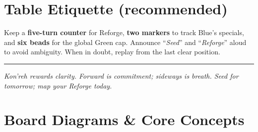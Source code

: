 \documentclass[11pt]{article}
\begin{document}
\section{Table Etiquette (recommended)}
\label{sec:etiquette}


Keep a \textbf{five-turn counter} for Reforge, \textbf{two markers} to track Blue’s specials, and \textbf{six beads} for the global Green cap. Announce “\textit{Seed}” and “\textit{Reforge}” aloud to avoid ambiguity. When in doubt, replay from the last clear position.

\vfill
\hrule
\small
\textit{Kon'reh rewards clarity. Forward is commitment; sideways is breath. Seed for tomorrow; map your Reforge today.}
\clearpage

\FloatBarrier
\needspace{0.80\textheight}


\section{Board Diagrams \& Core Concepts}
\vspace{-0.4\baselineskip}
\end{document}

